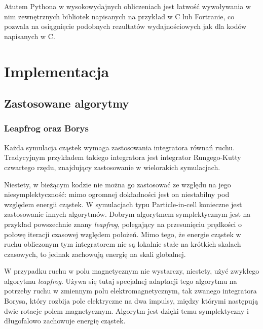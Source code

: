     Atutem Pythona w wysokowydajnych obliczeniach jest łatwość wywoływania w nim zewnętrznych bibliotek napisanych
    na przykład w C lub Fortranie, co pozwala na osiągnięcie podobnych rezultatów wydajnościowych jak dla kodów
    napisanych w C.


    \section[Implementacja]{Implementacja}%
    \subsection{Zastosowane algorytmy}
    \subsubsection{Leapfrog oraz Borys} 
    Każda symulacja cząstek wymaga zastosowania integratora równań ruchu. Tradycyjnym przykładem takiego
    integratora jest integrator Rungego-Kutty czwartego rzędu, znajdujący zastosowanie w wielorakich
    symulacjach. 

    Niestety, w bieżącym kodzie nie można go zastosować ze względu na jego niesymplektyczność:
    mimo ogromnej dokładności jest on niestabilny pod względem energii cząstek. 
    W symulacjach typu Particle-in-cell konieczne jest zastosowanie innych algorytmów. Dobrym algorytmem
    symplektycznym jest na przykład powszechnie znany \emph{leapfrog}, polegający na
    przesunięciu prędkości o połowę iteracji czasowej względem położeń.
    Mimo tego, że energie cząstek w ruchu obliczonym tym integratorem nie są lokalnie stałe na krótkich skalach
    czasowych, to jednak zachowują energię na skali globalnej.


    W przypadku ruchu w polu magnetycznym nie wystarczy, niestety, użyć zwykłego algorytmu \emph{leapfrog}. 
    Używa się tutaj specjalnej adaptacji tego algorytmu na potrzeby ruchu w zmiennym polu elektromagnetycznym,
    tak zwanego integratora Borysa, 
    który rozbija pole elektryczne na dwa impulsy, między którymi następują dwie 
    rotacje polem magnetycznym. Algorytm jest dzięki temu symplektyczny
    i długofalowo zachowuje energię cząstek.
    
